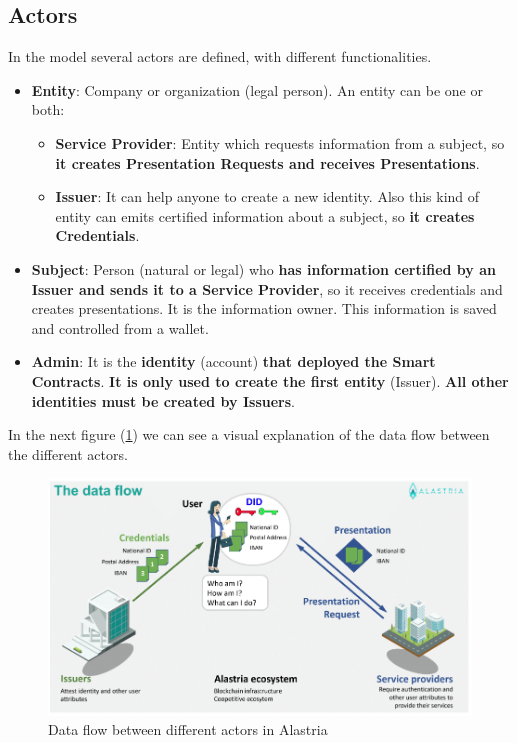 \documentclass[a4paper, 12pt]{article} %
\begin{document}
    \subsection{Actors}
        In the model several actors are defined, with different functionalities.
         \begin{itemize}
             \item \textbf{Entity}: Company or organization (legal person). An entity can be one or both:
             \begin{itemize}
                 \item \textbf{Service Provider}: Entity which requests information from a subject, so \textbf{it creates Presentation Requests and receives Presentations}.
                 \item \textbf{Issuer}: It can help anyone to create a new identity. Also this kind of entity can emits certified information about a subject, so \textbf{it creates Credentials}.
             \end{itemize}
             \item \textbf{Subject}: Person (natural or legal) who \textbf{has information certified by an Issuer and sends it to a Service Provider}, so it receives credentials and creates presentations. It is the information owner. This information is saved and controlled from a wallet.
             \item \textbf{Admin}: It is the \textbf{identity} (account) \textbf{that deployed the Smart Contracts}. \textbf{It is only used to create the first entity} (Issuer). \textbf{All other identities must be created by Issuers}.
        \end{itemize}
        In the next figure (\ref{fig:roles-ala}) we can see a visual explanation of the data flow between the different actors.
        \begin{figure}[h]
            \centering
            \includegraphics[width=1.0\textwidth]{roles-ala.png}
            \caption{Data flow between different actors in Alastria}
            \label{fig:roles-ala}
        \end{figure}
\end{document}
